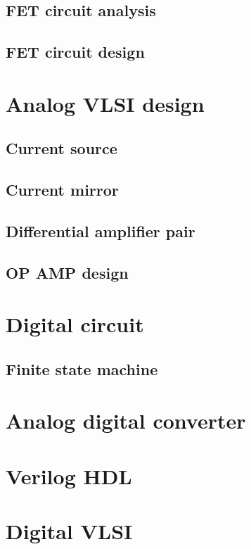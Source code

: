 \documentclass[UTF8]{book}
\begin{document}
	\chapter{FET circuit analysis}
	\label{FET circuit analysis}
	\chapter{FET circuit design}
	\label{FET circuit design}
	
	
	\part{Analog VLSI design}
	\label{Analog VLSI design}
	\chapter{Current source}
	\label{Current source}
	\chapter{Current mirror}
	\label{Current mirror }
	\chapter{Differential amplifier pair}
	\label{Differential amplifier pair}
	\chapter{OP AMP design}
	\label{OP AMP design}
	
	
	\part{Digital circuit}
	\label{Digital circuit}
	\chapter{Finite state machine}
	\label{Finite state machine}
	
	\part{Analog digital converter}
	\label{Analog digital converter}
	
	\part{Verilog HDL}
	\label{Verilog HDL}
	
	\part{Digital VLSI}
	\label{Digital VLSI}
\end{document}
